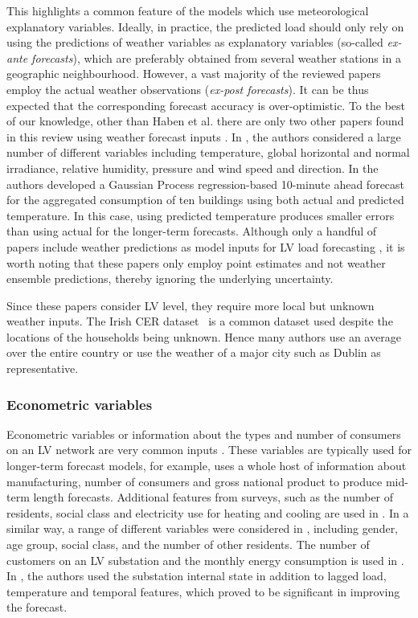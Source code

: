 This highlights a common feature of the models which use meteorological explanatory variables. Ideally, in practice, the predicted load should only rely on using the predictions of weather variables as explanatory variables (so-called \textit{ex-ante forecasts}), which are preferably obtained from several weather stations in a geographic neighbourhood. However, a vast majority of the reviewed papers employ the actual weather observations (\textit{ex-post forecasts}). It can be thus expected that the corresponding forecast accuracy is over-optimistic. To the best of our knowledge, other than Haben et al. \cite{Haben2019stl} there are only two other papers found in this review using weather forecast inputs \cite{prakash2018rbe, nespoli2020hdf}.  In \cite{nespoli2020hdf}, the authors considered a large number of different variables including temperature, global horizontal and normal irradiance, relative humidity, pressure and wind speed and direction. In \cite{prakash2018rbe} the authors developed a Gaussian Process regression-based 10-minute ahead forecast for the aggregated consumption of ten buildings using both actual and predicted temperature. In this case, using predicted temperature produces smaller errors than using actual for the longer-term forecasts. Although only a handful of papers include weather predictions as model inputs for LV load forecasting \cite{Haben2019stl, prakash2018rbe, nespoli2020hdf}, it is worth noting that these papers only employ point estimates and not weather ensemble predictions, thereby ignoring the underlying uncertainty.

Since these papers consider LV level, they require more local but unknown weather inputs. The Irish CER dataset~\cite{Commission2012csm} is a common dataset used despite the locations of the households being unknown. Hence many authors use an average over the entire country or use the weather of a major city such as Dublin as representative\cite{yang2020bdl}.

\subsubsection{Econometric variables}

Econometric variables or information about the types and number of consumers on an LV network are very common inputs \cite{Bunnoon2013mcc}. These variables are typically used for longer-term forecast models, for example, \cite{tsekouras2006anl} uses a whole host of information about manufacturing, number of consumers and gross national product to produce mid-term length forecasts. Additional features from surveys, such as the number of residents, social class and electricity use for heating and cooling are used in \cite{bessani2020mhv}. In a similar way, a range of different variables were considered in \cite{Kiguchi2019pil,kipping2016mad}, including gender, age group, social class, and the number of other residents.  The number of customers on an LV substation and the monthly energy consumption is used in \cite{konjic2005fis}. In \cite{idowu2016aml}, the authors used the substation internal state in addition to lagged load, temperature and temporal features, which proved to be significant in improving the forecast.

